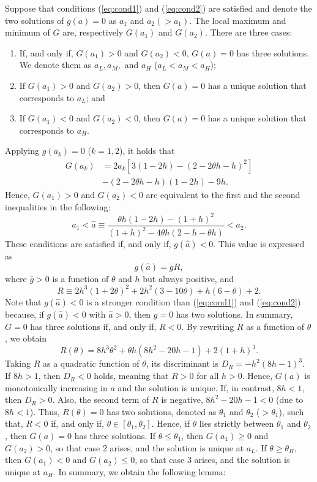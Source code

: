 Suppose that conditions (\ref{eq:cond1}) and (\ref{eq:cond2}) are satisfied and denote the two solutions of $g(a)=0$ as $a_{1}$ and $a_{2}(>a_{1})$. The local maximum and minimum of $G$ are, respectively $G(a_{1})$ and $G(a_{2})$. There are three cases: 
\begin{enumerate}
\item If, and only if, $G(a_{1})>0$ and $G(a_{2})<0$, $G(a)=0$ has three solutions. We denote them as $a_{L},a_{M},$ and $a_{H}$ ($a_{L}<a_{M}<a_{H}$);
\item If $G(a_{1})>0$ and $G(a_{2})>0$, then $G(a)=0$ has a unique solution that corresponds to $a_{L}$; and
\item If $G(a_{1})<0$ and $G(a_{2})<0$, then $G(a)=0$ has a unique solution that corresponds to $a_{H}$. 
\end{enumerate}
Applying $g(a_{k})=0$ ($k=1,2$), it holds that 
\begin{align*}
G(a_{k}) & =2a_{k}\left[3(1-2h)-(2-2\theta h-h)^{2}\right]\\
 & -(2-2\theta h-h)(1-2h)-9h.
\end{align*}
Hence, $G(a_{1})>0$ and $G(a_{2})<0$ are equivalent to the first and the second inequalities in the following:
\[
a_{1}<\hat{a}\equiv\frac{\theta h(1-2h)-(1+h)^{2}}{(1+h)^{2}-4\theta h\left(2-h-\theta h\right)}<a_{2}.
\]
These conditions are satisfied if, and only if, $g(\hat{a})<0$. This value is expressed as 
\[
g(\hat{a})=\bar{g}R,
\]
where $\bar{g}>0$ is a function of $\theta$ and $h$ but always positive, and 
\[
R\equiv2h^{3}(1+2\theta)^{2}+2h^{2}(3-10\theta)+h(6-\theta)+2.
\]
Note that $g(\hat{a})<0$ is a stronger condition than (\ref{eq:cond1}) and (\ref{eq:cond2}) because, if $g(\hat{a})<0$ with $\hat{a}>0$, then $g=0$ has two solutions. In summary, $G=0$ has three solutions if, and only if, $R<0$. By rewriting $R$ as a function of $\theta$, we obtain 
\begin{equation}
R(\theta)=8h^{3}\theta^{2}+\theta h(8h^{2}-20h-1)+2(1+h)^{3}.\label{eq:R}
\end{equation}
Taking $R$ as a quadratic function of $\theta$, its discriminant is $D_{R}=-h^{2}(8h-1)^{3}.$ If $8h>1$, then $D_{R}<0$ holds, meaning that $R>0$ for all $h>0$. Hence, $G(a)$ is monotonically increasing in $a$ and the solution is unique. If, in contrast, $8h<1$, then $D_{R}>0$. Also, the second term of $R$ is negative, $8h^{2}-20h-1<0$ (due to $8h<1$). Thus, $R(\theta)=0$ has two solutions, denoted as $\theta_{1}$ and $\theta_{2}$ ($>\theta_{1}$), such that, $R<0$ if, and only if, $\theta\in[\theta_{1},\theta_{2}]$. Hence, if $\theta$ lies strictly between $\theta_{1}$ and $\theta_{2}$, then $G(a)=0$ has three solutions. If $\theta\le\theta_{1}$, then $G(a_{1})\ge0$ and $G(a_{2})>0$, so that case 2 arises, and the solution is unique at $a_{L}$. If $\theta\ge\theta_{H}$, then $G(a_{1})<0$ and $G(a_{2})\le0$, so that case 3 arises, and the solution is unique at $a_{H}$. In summary, we obtain the following lemma:
